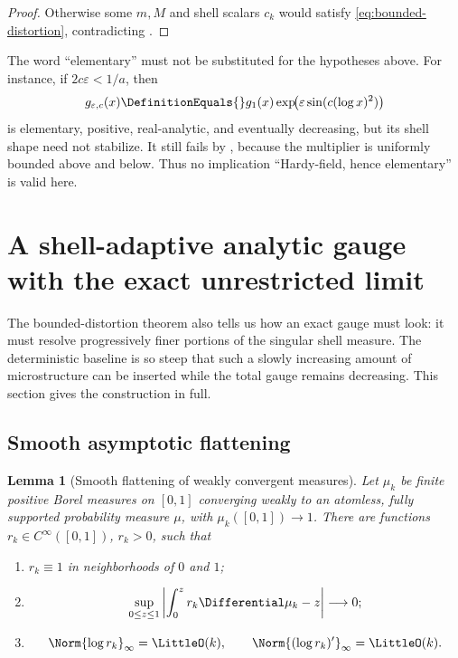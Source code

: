 \documentclass[11pt,oneside]{article}
\numberwithin{equation}{section}
\newtheorem{lemma}[theorem]{Lemma}
\theoremstyle{definition}
\theoremstyle{remark}
\begin{document}
\begin{proof}
Otherwise some $m,M$ and shell scalars $c_k$ would satisfy
\eqref{eq:bounded-distortion}, contradicting .
\end{proof}

The word ``elementary'' must not be substituted for the hypotheses above.  For instance,
if $2c\varepsilon<1/a$, then
\[
 g_{\varepsilon,c}(x)
 \DefinitionEquals{}g_1(x)\exp\!\bigl(\varepsilon\sin(c(\log x)^2)\bigr)
\]
is elementary, positive, real-analytic, and eventually decreasing, but its shell shape need
not stabilize.  It still fails by , because the multiplier is
uniformly bounded above and below.  Thus no implication ``Hardy-field, hence elementary''
is valid here.

\section{A shell-adaptive analytic gauge with the exact unrestricted limit}
\label{sec:adaptive-gauge}

The bounded-distortion theorem also tells us how an exact gauge must look: it must resolve
progressively finer portions of the singular shell measure.  The deterministic baseline is
so steep that such a slowly increasing amount of microstructure can be inserted while the
total gauge remains decreasing.  This section gives the construction in full.

\subsection{Smooth asymptotic flattening}

\begin{lemma}[Smooth flattening of weakly convergent measures]
\label{lem:flattening}
Let $\mu_k$ be finite positive Borel measures on $[0,1]$ converging weakly to an atomless,
fully supported probability measure $\mu$, with $\mu_k([0,1])\to1$.  There are functions
$r_k\in C^\infty([0,1])$, $r_k>0$, such that
\begin{enumerate}
\item $r_k\equiv1$ in neighborhoods of $0$ and $1$;
\item
\begin{equation}
 \sup_{0\le z\le1}
 \left|\int_0^zr_k\Differential\mu_k-z\right|\longrightarrow0;
 \label{eq:flattening-cdf}
\end{equation}
\item
\begin{equation}
 \Norm{\log r_k}_\infty=\LittleO(k),
 \qquad
 \Norm{(\log r_k)'}_\infty=\LittleO(k).
 \label{eq:flattening-slopes}
\end{equation}
\end{enumerate}
\end{lemma}
\end{document}
